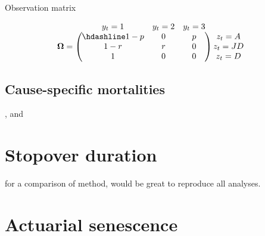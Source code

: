 \documentclass[
  12pt,
]{krantz}
\begin{document}
Observation matrix

\[\begin{matrix}
& \\
\mathbf{\Omega} =
  \left ( \vphantom{ \begin{matrix} 12 \\ 12 \\ 12\end{matrix} } \right .
          \end{matrix}
          \hspace{-1.2em}
          \begin{matrix}
          y_t=1 & y_t=2 & y_t=3 \\ \hdashline
          1 - p & 0 & p\\
          1 - r & r & 0\\
          1 & 0 & 0
          \end{matrix}
          \hspace{-0.2em}
          \begin{matrix}
          & \\
          \left . \vphantom{ \begin{matrix} 12 \\ 12 \\ 12 \end{matrix} } \right )
\begin{matrix}
z_{t}=A \\ z_{t}=JD \\ z_{t}=D
\end{matrix}
\end{matrix}\]

\subsection{Cause-specific mortalities}\label{cause-specific-mortalities}

\citet{koons2014}, \citet{fernandez-chacon_causes_2016} and \citet{ruette_comparative_2015}

\section{Stopover duration}\label{stopover-duration}

\citet{guerin_advances_2017} for a comparison of method, would be great to reproduce all analyses.

\section{Actuarial senescence}\label{actuarial-senescence}
\end{document}
